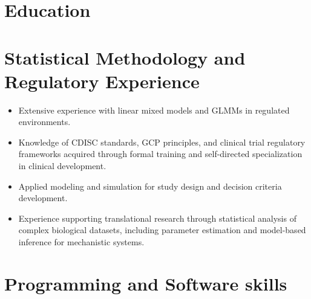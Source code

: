 \documentclass[11pt,a4paper,sans]{moderncv}        %
\newcommand{\skill}[1]{%
	\foreach \x in {1,...,5}{%
		\vspace{-0.3cm}\ifnumgreater{\x}{#1}{\space\color{lightgray}}{\space\color{blc}}\faCircle}\par%
}
\begin{document}
\section{Education}

\vspace{-0.3cm}
\section{Statistical Methodology and Regulatory Experience}
\begin{itemize}
\item Extensive experience with linear mixed models and GLMMs in regulated environments.


\item  Knowledge of CDISC standards, GCP principles, and clinical trial regulatory frameworks acquired through formal training and self-directed specialization in clinical development.

\item Applied modeling and simulation for study design and decision criteria development.

\item Experience supporting translational research through statistical analysis of complex biological datasets, including parameter estimation and model-based inference for mechanistic systems.

\end{itemize}
\vspace{-0.3cm}
\section{Programming and Software skills}
\end{document}
